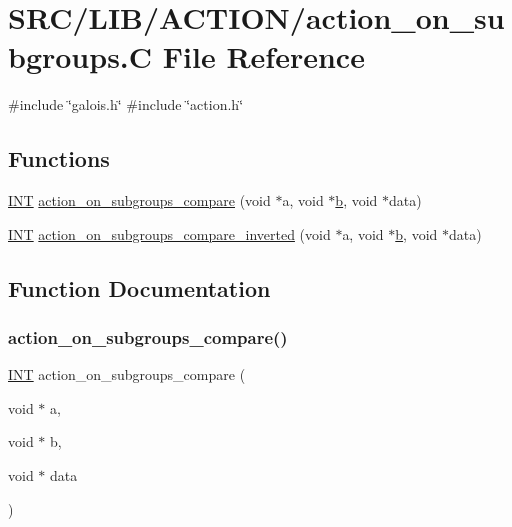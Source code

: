 \hypertarget{action__on__subgroups_8_c}{}\section{S\+R\+C/\+L\+I\+B/\+A\+C\+T\+I\+O\+N/action\+\_\+on\+\_\+subgroups.C File Reference}
\label{action__on__subgroups_8_c}
{\ttfamily \#include \char`\"{}galois.\+h\char`\"{}}\newline
{\ttfamily \#include \char`\"{}action.\+h\char`\"{}}\newline
\subsection*{Functions}
\begin{DoxyCompactItemize}
\item 
\mbox{\hyperlink{galois_8h_a09fddde158a3a20bd2dcadb609de11dc}{I\+NT}} \mbox{\hyperlink{action__on__subgroups_8_c_a4edd2daedf9740528b0ec94985c5d997}{action\+\_\+on\+\_\+subgroups\+\_\+compare}} (void $\ast$a, void $\ast$\mbox{\hyperlink{alphabet2_8_c_a148e3876077787926724625411d6e7a9}{b}}, void $\ast$data)
\item 
\mbox{\hyperlink{galois_8h_a09fddde158a3a20bd2dcadb609de11dc}{I\+NT}} \mbox{\hyperlink{action__on__subgroups_8_c_abfbf8b6ad3534d68687452503d460629}{action\+\_\+on\+\_\+subgroups\+\_\+compare\+\_\+inverted}} (void $\ast$a, void $\ast$\mbox{\hyperlink{alphabet2_8_c_a148e3876077787926724625411d6e7a9}{b}}, void $\ast$data)
\end{DoxyCompactItemize}


\subsection{Function Documentation}
\mbox{\label{action__on__subgroups_8_c_a4edd2daedf9740528b0ec94985c5d997}} 
\subsubsection{\texorpdfstring{action\+\_\+on\+\_\+subgroups\+\_\+compare()}{action\_on\_subgroups\_compare()}}
{\footnotesize\ttfamily \mbox{\hyperlink{galois_8h_a09fddde158a3a20bd2dcadb609de11dc}{I\+NT}} action\+\_\+on\+\_\+subgroups\+\_\+compare (\begin{DoxyParamCaption}\item[{void $\ast$}]{a,  }\item[{void $\ast$}]{b,  }\item[{void $\ast$}]{data }\end{DoxyParamCaption})}

